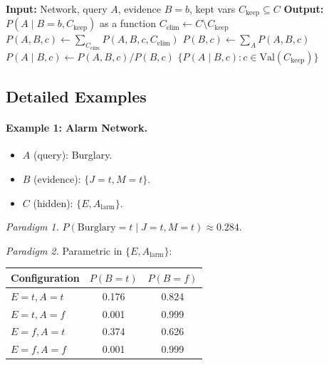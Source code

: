 \begin{algorithmbox}
\begin{algorithm}[H]
\caption{Direct Formula --- Parametric Version}
\begin{algorithmic}[1]
\State \textbf{Input:} Network, query $A$, evidence $B=b$, kept vars
       $C_{\mathrm{keep}}\subseteq C$
\State \textbf{Output:} $P(A\mid B=b,C_{\mathrm{keep}})$ as a function
\State $C_{\mathrm{elim}}\leftarrow C\setminus C_{\mathrm{keep}}$
    \State $P(A,B,c)\leftarrow\sum_{C_{\mathrm{elim}}} P(A,B,c,C_{\mathrm{elim}})$
    \State $P(B,c)\leftarrow\sum_A P(A,B,c)$
    \State $P(A\mid B,c)\leftarrow P(A,B,c)/P(B,c)$
\EndFor
\State \Return $\{P(A\mid B,c):c\in\mathrm{Val}(C_{\mathrm{keep}})\}$
\end{algorithmic}
\end{algorithm}
\end{algorithmbox}

\subsection{Detailed Examples}

\paragraph{Example 1: Alarm Network.}
\begin{itemize}
    \item $A$ (query): Burglary.
    \item $B$ (evidence): $\{J=t,M=t\}$.
    \item $C$ (hidden): $\{E,A_{\mathrm{larm}}\}$.
\end{itemize}

\textit{Paradigm 1.}
$P(\text{Burglary}=t\mid J=t,M=t)\approx 0.284$.

\textit{Paradigm 2.} Parametric in $\{E,A_{\mathrm{larm}}\}$:
\begin{center}
\begin{tabular}{lcc}
\hline
\textbf{Configuration} & $P(B=t)$ & $P(B=f)$ \\\hline
$E=t,A=t$   & 0.176 & 0.824 \\
$E=t,A=f$   & 0.001 & 0.999 \\
$E=f,A=t$   & 0.374 & 0.626 \\
$E=f,A=f$   & 0.001 & 0.999 \\\hline
\end{tabular}
\end{center}

